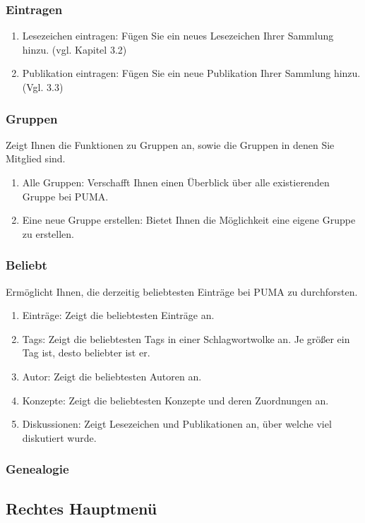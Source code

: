\documentclass[a4paper,11pt,twoside]{scrbook}
\begin{document}
\subsubsection{Eintragen}
\begin{enumerate}
    \item Lesezeichen eintragen: Fügen Sie ein neues Lesezeichen Ihrer Sammlung hinzu. (vgl. Kapitel 3.2) 
    \item Publikation eintragen: Fügen Sie ein neue Publikation Ihrer Sammlung hinzu. (Vgl. 3.3)
\end{enumerate}
\subsubsection{Gruppen}
Zeigt Ihnen die Funktionen zu Gruppen an, sowie die Gruppen in denen Sie Mitglied sind.
\begin{enumerate}
    \item Alle Gruppen: Verschafft Ihnen einen Überblick über alle existierenden Gruppe bei PUMA.
    \item Eine neue Gruppe erstellen: Bietet Ihnen die Möglichkeit eine eigene Gruppe zu erstellen.
\end{enumerate}
\subsubsection{Beliebt}
Ermöglicht Ihnen, die derzeitig beliebtesten Einträge bei PUMA zu durchforsten.
\begin{enumerate}
    \item Einträge: Zeigt die beliebtesten Einträge an.
    \item Tags: Zeigt die beliebtesten Tags in einer Schlagwortwolke an. Je größer ein Tag ist, desto beliebter ist er.
    \item Autor: Zeigt die beliebtesten Autoren an.
    \item Konzepte: Zeigt die beliebtesten Konzepte und deren Zuordnungen an. 
    \item Diskussionen: Zeigt Lesezeichen und Publikationen an, über welche viel diskutiert wurde. 
\end{enumerate}
\subsubsection{Genealogie}

\subsection{Rechtes Hauptmenü}
\end{document}

